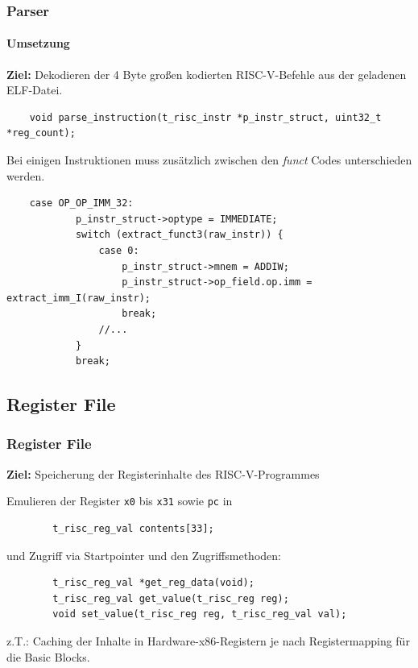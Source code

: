 \documentclass[german]{tum-presentation}
\begin{document}
\begin{frame}[fragile]
	\frametitle{Parser}
	\framesubtitle{Umsetzung}
	\textbf{Ziel:} Dekodieren der 4 Byte großen kodierten RISC-V-Befehle aus der geladenen ELF-Datei.
	\begin{lstlisting}
	void parse_instruction(t_risc_instr *p_instr_struct, uint32_t *reg_count);
	\end{lstlisting}
	Bei einigen Instruktionen muss zusätzlich zwischen den \textit{funct} Codes unterschieden werden.
	\begin{lstlisting}
    case OP_OP_IMM_32:
            p_instr_struct->optype = IMMEDIATE;
            switch (extract_funct3(raw_instr)) {
                case 0:
                    p_instr_struct->mnem = ADDIW;
                    p_instr_struct->op_field.op.imm = extract_imm_I(raw_instr);
                    break;
                //...
            }
            break;
	\end{lstlisting}
\end{frame}



\subsection{Register File} %
\begin{frame}[fragile]
	\frametitle{Register File}
	\textbf{Ziel:} Speicherung der Registerinhalte des RISC-V-Programmes
	
	\vspace{1cm}
	\pause
	Emulieren der Register \verb!x0! bis \verb!x31! sowie \verb!pc! in
	\begin{lstlisting}
		t_risc_reg_val contents[33];
	\end{lstlisting}
	
	\pause
	und Zugriff via Startpointer und den Zugriffsmethoden:
	
	\begin{lstlisting}
		t_risc_reg_val *get_reg_data(void);
		t_risc_reg_val get_value(t_risc_reg reg);
		void set_value(t_risc_reg reg, t_risc_reg_val val);
	\end{lstlisting}
	
	z.T.: Caching der Inhalte in Hardware-x86-Registern je nach Registermapping für die Basic Blocks.
\end{frame}
\end{document}
